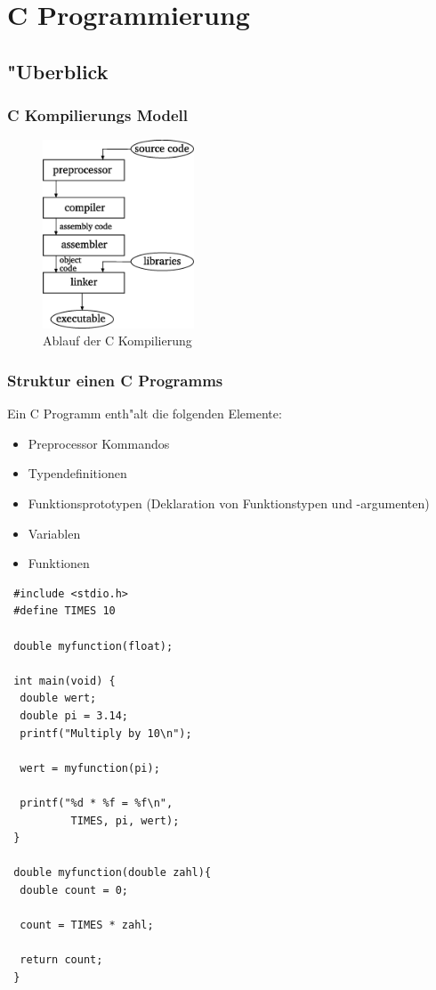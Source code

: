 \documentclass[german, 10pt, a4paper, twocolumn]{scrartcl}
\begin{document}
\section{C Programmierung}

\subsection{"Uberblick}

\subsubsection{C Kompilierungs Modell}

\begin{figure}[hbt]
 \begin{center}
 	\includegraphics[width=0.4\textwidth]{c_compilation.eps}
 \end{center}
 \label{c_compilation}
 \caption{Ablauf der C Kompilierung}
\end{figure}

\subsubsection{Struktur einen C Programms}

Ein C Programm enth"alt die folgenden Elemente:
\begin{itemize}
	\item Preprocessor Kommandos
	\item Typendefinitionen
	\item Funktionsprototypen (Deklaration von Funktionstypen und -argumenten)
	\item Variablen
	\item Funktionen
\end{itemize}

\begin{verbatim}
 #include <stdio.h>
 #define TIMES 10
 
 double myfunction(float);

 int main(void) {
  double wert;
  double pi = 3.14;
  printf("Multiply by 10\n");

  wert = myfunction(pi);

  printf("%d * %f = %f\n",
          TIMES, pi, wert);
 }

 double myfunction(double zahl){
  double count = 0;

  count = TIMES * zahl;

  return count;
 }
\end{verbatim}
\end{document}

